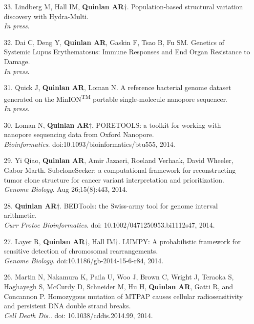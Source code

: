 \documentclass[margin,line]{cv}
\begin{document}
\begin{resume}
\begin{list}{*}{}
    \item[33.] Lindberg M, Hall IM, \textbf{Quinlan AR}$\dagger$.
    Population-based structural variation discovery with Hydra-Multi.\\
    \emph{In press}.

    \item[32.] Dai C, Deng Y, \textbf{Quinlan AR}, Gaskin F, Tsao B, Fu SM.
    Genetics of Systemic Lupus Erythematosus: Immune Responses and End Organ Resistance to Damage.\\
    \emph{In press}.

    \item[31.] Quick J, \textbf{Quinlan AR}, Loman N.
    A reference bacterial genome dataset generated on the MinION\textsuperscript{TM} portable single-molecule nanopore sequencer.\\
    \emph{In press}.

    \item[30.] Loman N, \textbf{Quinlan AR}$\dagger$.
    PORETOOLS: a toolkit for working with nanopore sequencing data from Oxford Nanopore.\\
    \emph{Bioinformatics}. doi:10.1093/bioinformatics/btu555, 2014.

    \item[29.] Yi Qiao, \textbf{Quinlan AR}, Amir Jazaeri, Roeland Verhaak, David Wheeler, Gabor Marth.
    SubcloneSeeker: a computational framework for reconstructing tumor clone structure for cancer variant interpretation and prioritization.\\
    \emph{Genome Biology}. Aug 26;15(8):443, 2014.

    \item[28.] \textbf{Quinlan AR}$\dagger$.
    BEDTools: the Swiss-army tool for genome interval arithmetic.\\
    \emph{Curr Protoc Bioinformatics}. doi: 10.1002/0471250953.bi1112s47, 2014.

    \item[27.] Layer R, \textbf{Quinlan AR}$\dagger$, Hall IM$\dagger$.
    LUMPY: A probabilistic framework for sensitive detection of chromosomal rearrangements.\\
    \emph{Genome Biology}. doi:10.1186/gb-2014-15-6-r84, 2014.

    \item[26.] Martin N, Nakamura K, Paila U, Woo J, Brown C, Wright J, Teraoka S, Haghayegh S, McCurdy D, Schneider M, Hu H, \textbf{Quinlan AR}, Gatti R, and Concannon P.
    Homozygous mutation of MTPAP causes cellular radiosensitivity and persistent DNA double strand breaks.\\
    \emph{Cell Death Dis.}. doi: 10.1038/cddis.2014.99, 2014.


\end{list}
\end{resume}
\end{document}
